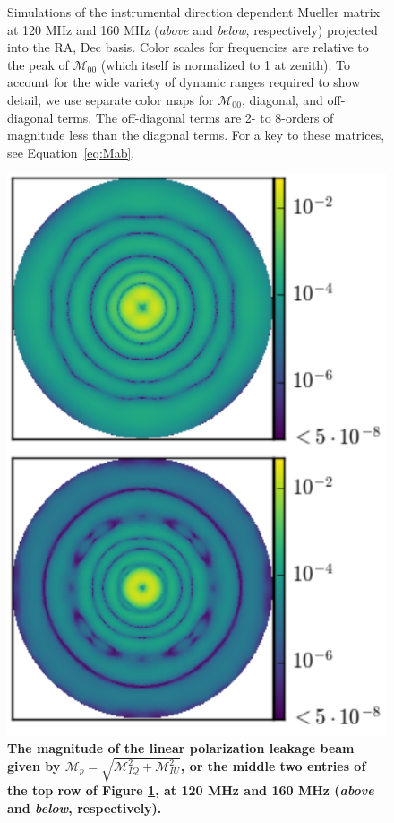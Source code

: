\documentclass[twocolumn, trackchanges]{aastex61}
\newcommand{\edited}[1]{{\bf \color{blue} #1}}
\begin{document}
\begin{figure}
\caption{Simulations of the instrumental direction dependent Mueller matrix at 120 MHz and 160 MHz (\textit{above} and \textit{below}, respectively) projected into the RA, Dec basis. Color scales for frequencies are relative to the peak of $\mathcal{M}_{00}$ (which itself is normalized to 1 at zenith). To account for the wide variety of dynamic ranges required to show detail, we use separate color maps for $\mathcal{M}_{00}$, diagonal, and off-diagonal terms. The off-diagonal terms are 2- to 8-orders of magnitude less than the diagonal terms. For a key to these matrices, see Equation~\ref{eq:Mab}.
}
\label{fig:mueller}
\end{figure}

\begin{figure}
\centering
\hspace{-0.5cm}
\includegraphics[scale=0.6]{M_p.pdf}
\caption{\edited{The magnitude of the linear polarization leakage beam given by $\mathcal{M}_p = \sqrt{\mathcal{M}_{IQ}^2 + \mathcal{M}_{IU}^2}$, or the middle two entries of the top row of Figure \ref{fig:mueller}, at 120 MHz and 160 MHz (\textit{above} and \textit{below}, respectively).
}}
\end{figure}
\end{document}
